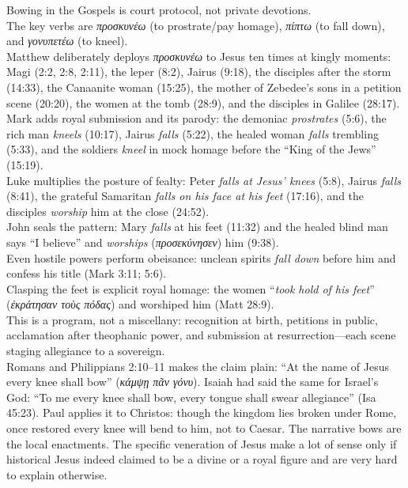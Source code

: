 Bowing in the Gospels is court protocol, not private devotions.\\
The key verbs are \emph{προσκυνέω} (to prostrate/pay homage), \emph{πίπτω} (to fall down), and \emph{γονυπετέω} (to kneel).\\
Matthew deliberately deploys \emph{προσκυνέω} to Jesus ten times at kingly moments: Magi (2:2, 2:8, 2:11), the leper (8:2), Jairus (9:18), the disciples after the storm (14:33), the Canaanite woman (15:25), the mother of Zebedee’s sons in a petition scene (20:20), the women at the tomb (28:9), and the disciples in Galilee (28:17).\\
Mark adds royal submission and its parody: the demoniac \emph{prostrates} (5:6), the rich man \emph{kneels} (10:17), Jairus \emph{falls} (5:22), the healed woman \emph{falls} trembling (5:33), and the soldiers \emph{kneel} in mock homage before the “King of the Jews” (15:19).\\
Luke multiplies the posture of fealty: Peter \emph{falls at Jesus’ knees} (5:8), Jairus \emph{falls} (8:41), the grateful Samaritan \emph{falls on his face at his feet} (17:16), and the disciples \emph{worship} him at the close (24:52).\\
John seals the pattern: Mary \emph{falls} at his feet (11:32) and the healed blind man says “I believe” and \emph{worships} (\emph{προσεκύνησεν}) him (9:38).\\
Even hostile powers perform obeisance: unclean spirits \emph{fall down} before him and confess his title (Mark 3:11; 5:6).\\
Clasping the feet is explicit royal homage: the women “\emph{took hold of his feet}” (\emph{ἐκράτησαν τοὺς πόδας}) and worshiped him (Matt 28:9).\\
This is a program, not a miscellany: recognition at birth, petitions in public, acclamation after theophanic power, and submission at resurrection—each scene staging allegiance to a sovereign.\\
Romans and Philippians 2:10–11 makes the claim plain: “At the name of Jesus every knee shall bow” (\emph{κάμψῃ πᾶν γόνυ}).
Isaiah had said the same for Israel’s God: “To me every knee shall bow, every tongue shall swear allegiance” (Isa 45:23).
Paul applies it to Christos: though the kingdom lies broken under Rome, once restored every knee will bend to him, not to Caesar.
The narrative bows are the local enactments.
The specific veneration of Jesus make a lot of sense only if historical Jesus indeed claimed to be a divine or a royal figure and are very hard to explain otherwise.

